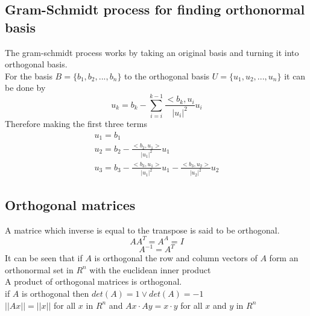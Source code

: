 \documentclass[12pt, a4paper]{article}
\begin{document}
		\subsection{Gram-Schmidt process for finding orthonormal basis}
			The gram-schmidt process works by taking an original basis and turning it into orthogonal basis.\\
			For the basis $B=\{b_1,b_2,...,b_n\}$ to the orthogonal basis $U=\{u_1,u_2,...,u_n\}$ it can be done by
			$$u_k=b_k-\sum\limits_{i=i}^{k-1}\frac{<b_k,u_i}{|u_i|^2}u_i$$
			Therefore making the first three terms
			\begin{align}
				u_1=b_1\\
				u_2=b_2-\frac{<b_2,u_1>}{|u_1|^2}u_1\\
				u_3=b_3-\frac{<b_3,u_1>}{|u_1|^2}u_1-\frac{<b_3,u_2>}{|u_2|^2}u_2
			\end{align}
		\subsection{Orthogonal matrices}
			A matrice which inverse is equal to the transpose is said to be orthogonal.\\
			$$AA^T=A^A=I$$
			$$A^{-1}=A^T$$
			It can be seen that if $A$ is orthogonal the row and column vectors of $A$ form an orthonormal set in $R^n$ with the euclidean inner product\\
			A product of orthogonal matrices is orthogonal.\\
			if $A$ is orthogonal then $det(A)=1 \lor det(A)=-1$\\
			$||Ax||=||x||$ for all $x$ in $R^n$ and $Ax\cdot Ay=x\cdot y$ for all $x$ and $y$ in $R^n$	
\end{document}
